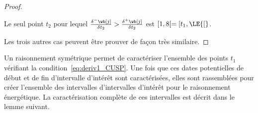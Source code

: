 \begin{proof}
\begin{minipage}{\linewidth}
\begin{minipage}{0.55\linewidth}
\begin{figure}[H]
  \end{figure}
\end{minipage}
\end{minipage}

Le seul point $t_2$ pour lequel $ \frac{\delta^{-}\wb[j]}{\delta t_2} >
\frac{\delta^{+}\wb[j]}{\delta t_2}$ est $[1,8[= [t_1, \LE{[}$. 

Les trois autres cas peuvent être prouver de façon très similaire. 
\end{proof}

Un raisonnement symétrique permet de caractériser l'ensemble des
points $t_1$ vérifiant la condition~\eqref{eq:deriv1_CUSP}. Une fois
que ces dates potentielles de début et de fin d'intervalle d'intérêt
sont caractérisées, elles sont rassemblées pour créer l'ensemble des
intervalles d'intervalles d'intérêt pour le raisonnement énergétique. 
La caractérisation complète de ces intervalles est décrit dans le
lemme suivant.


